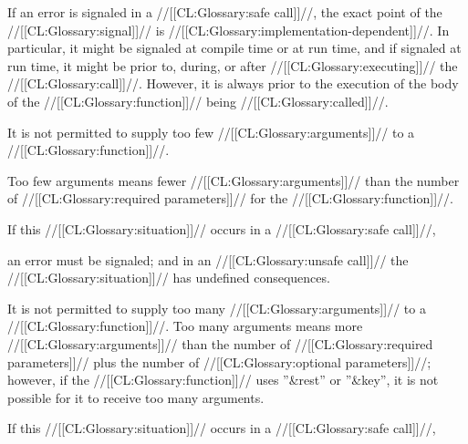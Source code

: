 
If an error is signaled in a //[[CL:Glossary:safe call]]//,
the exact point of the //[[CL:Glossary:signal]]// is //[[CL:Glossary:implementation-dependent]]//.
In particular, it might be signaled at compile time or at run time,
and if signaled at run time, 
it might be prior to, during, or after //[[CL:Glossary:executing]]// the //[[CL:Glossary:call]]//.
However, it is always prior to the execution of the body of the //[[CL:Glossary:function]]// 
being //[[CL:Glossary:called]]//.

\endsubsubsubsection%

\endsubsubsection%


It is not permitted to supply too few //[[CL:Glossary:arguments]]// to a //[[CL:Glossary:function]]//.

Too few arguments means fewer //[[CL:Glossary:arguments]]// than the number of //[[CL:Glossary:required parameters]]// 
for the //[[CL:Glossary:function]]//.



If this //[[CL:Glossary:situation]]// occurs in a //[[CL:Glossary:safe call]]//,

an error  must be signaled;
and in an //[[CL:Glossary:unsafe call]]// the //[[CL:Glossary:situation]]// has undefined consequences.








\endsubsubsection%


It is not permitted to supply too many //[[CL:Glossary:arguments]]// to a //[[CL:Glossary:function]]//.
Too many arguments means more //[[CL:Glossary:arguments]]// than the number of //[[CL:Glossary:required parameters]]//
plus the number of //[[CL:Glossary:optional parameters]]//; however, if the //[[CL:Glossary:function]]// 
uses ''&rest'' or ''&key'', it is not possible for it to receive too many arguments.



If this //[[CL:Glossary:situation]]// occurs in a //[[CL:Glossary:safe call]]//,

